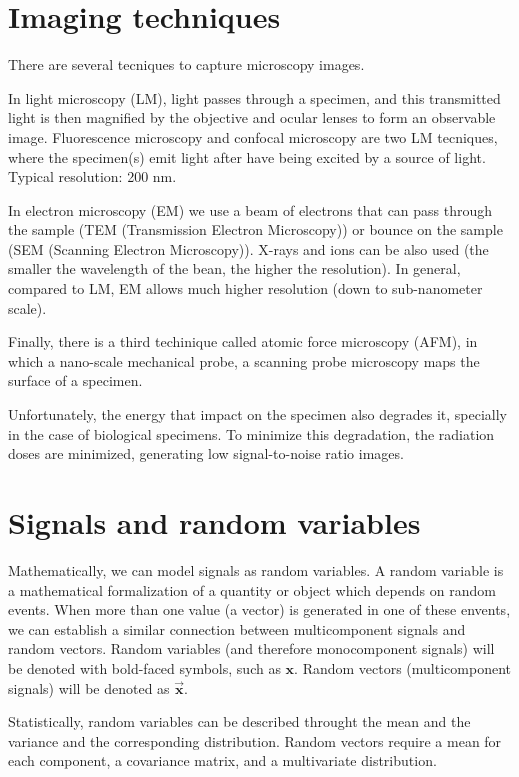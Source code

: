 \documentclass{article}
\begin{document}

\section{Imaging techniques}

There are several tecniques to capture microscopy images.

In light microscopy (LM), light passes through a specimen, and this
transmitted light is then magnified by the objective and ocular lenses
to form an observable image. Fluorescence microscopy and confocal
microscopy are two LM tecniques, where the specimen(s) emit light
after have being excited by a source of light. Typical resolution: 200
nm.

In electron microscopy (EM) we use a beam of electrons that can pass
through the sample (TEM (Transmission Electron Microscopy)) or bounce
on the sample (SEM (Scanning Electron Microscopy)). X-rays and ions
can be also used (the smaller the wavelength of the bean, the higher
the resolution). In general, compared to LM, EM allows much higher
resolution (down to sub-nanometer scale).

Finally, there is a third techinique called atomic force microscopy
(AFM), in which a nano-scale mechanical probe, a scanning probe
microscopy maps the surface of a specimen.

Unfortunately, the energy that impact on the specimen also degrades
it, specially in the case of biological specimens. To minimize this
degradation, the radiation doses are minimized, generating low
signal-to-noise ratio images.


\section{Signals and random variables}
Mathematically, we can model signals as random variables. A random
variable is a mathematical formalization of a quantity or object which
depends on random events. When more than one value (a vector) is
generated in one of these envents, we can establish a similar
connection between multicomponent signals and random vectors. Random
variables (and therefore monocomponent signals) will be denoted with
bold-faced symbols, such as $\mathbf{x}$. Random vectors
(multicomponent signals) will be denoted as
$\overrightarrow{\mathbf{x}}$.

Statistically, random variables can be described throught the mean and
the variance and the corresponding distribution. Random vectors
require a mean for each component, a covariance matrix, and a
multivariate distribution.
\end{document}
